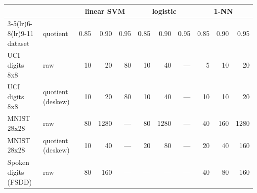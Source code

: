 \begin{tabular}{l l r r r r r r r r r}
\toprule
& & \multicolumn{3}{c}{linear SVM} & \multicolumn{3}{c}{logistic} & \multicolumn{3}{c}{1-NN} \\
\cmidrule(lr){3-5}\cmidrule(lr){6-8}\cmidrule(lr){9-11}
dataset & quotient & 0.85 & 0.90 & 0.95 & 0.85 & 0.90 & 0.95 & 0.85 & 0.90 & 0.95 \\
\midrule
UCI digits 8x8 & raw & 10 & 20 & 80 & 10 & 40 & --- & 5 & 10 & 20 \\
UCI digits 8x8 & quotient (deskew) & 10 & 20 & 80 & 10 & 40 & --- & 10 & 10 & 20 \\
MNIST 28x28 & raw & 80 & 1280 & --- & 80 & 1280 & --- & 40 & 160 & 1280 \\
MNIST 28x28 & quotient (deskew) & 10 & 40 & --- & 20 & 80 & --- & 20 & 40 & 160 \\
Spoken digits (FSDD) & raw & 80 & 160 & --- & --- & --- & --- & 40 & 80 & 160 \\
\bottomrule
\end{tabular}
